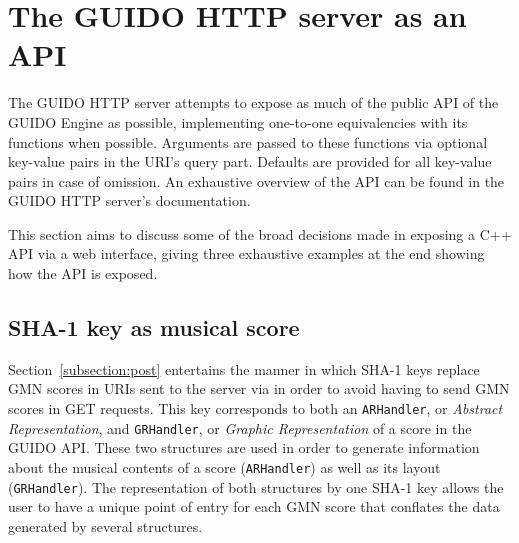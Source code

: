 \documentclass[11pt,a4paper]{article}
\begin{document}

\section{The GUIDO HTTP server as an API}\label{section:guido-api}
The GUIDO HTTP server attempts to expose as much of the public API of the GUIDO Engine as possible, implementing one-to-one equivalencies with its functions when possible.  Arguments are passed to these functions via optional key-value pairs in the URI's query part.  Defaults are provided for all key-value pairs in case of omission.  An exhaustive overview of the API can be found in the GUIDO HTTP server's documentation\cite{guidoweb0.50}.\par
This section aims to discuss some of the broad decisions made in exposing a C++ API via a web interface, giving three exhaustive examples at the end showing how the API is exposed.

\subsection{SHA-1 key as musical score}
Section~\ref{subsection:post} entertains the manner in which SHA-1 keys replace GMN scores in URIs sent to the server via in order to avoid having to send GMN scores in GET requests. This key corresponds to both an \verb=ARHandler=, or \emph{Abstract Representation}, and \verb=GRHandler=, or \emph{Graphic Representation} of a score in the GUIDO API.  These two structures are used in order to generate information about the musical contents of a score (\verb=ARHandler=) as well as its layout (\verb=GRHandler=). The representation of both structures by one SHA-1 key allows the user to have a unique point of entry for each GMN score that conflates the data generated by several structures.
\end{document}
